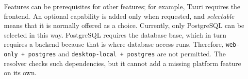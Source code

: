 \begin{beginnerstatement}

Features can be prerequisites for other features; for example, Tauri requires
the frontend. An optional capability is added only when requested, and
\emph{selectable} means that it is normally offered as a choice. Currently,
only PostgreSQL can be selected in this way. PostgreSQL requires the database
base, which in turn requires a backend because that is where database access
runs. Therefore, \texttt{web-only + postgres} and
\texttt{desktop-local + postgres} are not permitted. The resolver checks such
dependencies, but it cannot add a missing platform feature on its own.

\end{beginnerstatement}
